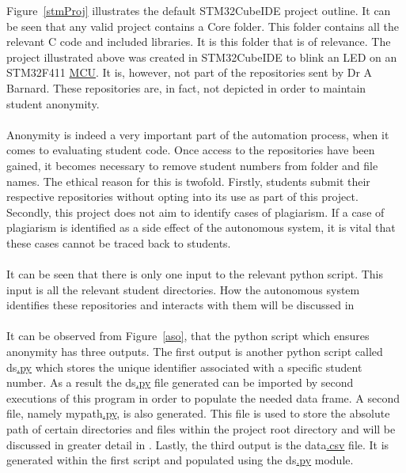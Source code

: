 Figure~\ref{stmProj} illustrates the default STM32CubeIDE project outline. It can be seen that any valid project contains a Core folder. This folder contains all the relevant C code and included libraries. It is this folder that is of relevance. The project illustrated above was created in STM32CubeIDE to blink an LED on an STM32F411 \hyperref[listAbr]{MCU}. It is, however, not part of the repositories sent by Dr A Barnard. These repositories are, in fact, not depicted in order to maintain student anonymity. 
\\\\
Anonymity is indeed a very important part of the automation process, when it comes to evaluating student code. Once access to the repositories have been gained, it becomes necessary to remove student numbers from folder and file names. The ethical reason for this is twofold. Firstly, students submit their respective repositories without opting into its use as part of this project. Secondly, this project does not aim to identify cases of plagiarism. If a case of plagiarism is identified as a side effect of the autonomous system, it is vital that these cases cannot be traced back to students.
\\\\
It can be seen that there is only one input to the relevant python script. This input is all the relevant student directories. How the autonomous system identifies these repositories and interacts with them will be discussed in \textbf{}
\\\\
It can be observed from Figure~\ref{aso}, that the python script which ensures anonymity has three outputs. The first output is another python script called ds\hyperref[listExt]{.py} which stores the unique identifier associated with a specific student number. As a result the ds\hyperref[listExt]{.py} file generated can be imported by second executions of this program in order to populate the needed data frame. A second file, namely mypath\hyperref[listExt]{.py}, is also generated. This file is used to store the absolute path of certain directories and files within the project root directory and will be discussed in greater detail in \textbf{}. Lastly, the third output is the data\hyperref[listExt]{.csv} file. It is generated within the first script and populated using the ds\hyperref[listExt]{.py} module.

